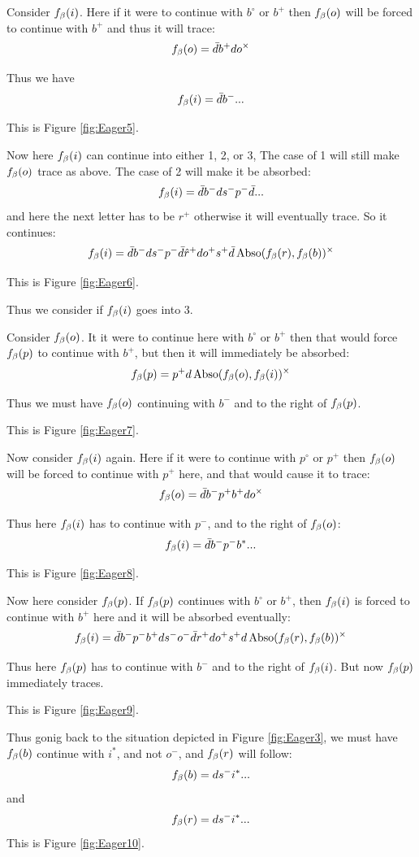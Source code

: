 Consider $f_\beta(i)$. Here if it were to continue with $b^\circ$ or $b^+$ then $f_\beta(o)$ will be forced to continue with $b^+$ and thus it will trace:
\[
f_\beta(o) = \bar{d} b^+ d o^\times
\]

Thus we have
\[
f_\beta(i) = \bar{d} b^-...
\]

This is Figure \ref{fig:Eager5}.

Now here $f_\beta(i)$ can continue into either 1, 2, or 3, The case of 1 will still make $f_\beta(o)$ trace as above. The case of 2 will make it be absorbed:
\[
f_\beta(i) = \bar{d} b^- d s^- p^- \bar{d}...
\]
and here the next letter has to be $r^+$ otherwise it will eventually trace. So it continues:
\[
f_\beta(i) = \bar{d} b^- d s^- p^- \bar{d} \hat{r}^+ d o^+ s^+ \bar{d} \operatorname{Abso}(f_\beta(r), f_\beta(b))^\times
\]

This is Figure \ref{fig:Eager6}.

Thus we consider if $f_\beta(i)$ goes into 3. 


Consider $f_\beta(o)$. It it were to continue here with $b^\circ$ or $b^+$ then that would force $f_\beta(p)$ to continue with $b^+$, but then it will immediately be absorbed:
\[
f_\beta(p) = p^+ d \operatorname{Abso}(f_\beta(o), f_\beta(i))^\times
\]

Thus we must have $f_\beta(o)$ continuing with $b^-$ and to the right of $f_\beta(p)$.

This is Figure \ref{fig:Eager7}.

Now consider $f_\beta(i)$ again. Here if it were to continue with $p^\circ$ or $p^+$ then $f_\beta(o)$ will be forced to continue with $p^+$ here, and that would cause it to trace:
\[
f_\beta(o) = \bar{d} b^- p^+ b^+ d o^\times
\]

Thus here $f_\beta(i)$ has to continue with $p^-$, and to the right of $f_\beta(o)$:
\[
f_\beta(i) = \bar{d} b^- p^- b^*...
\]

This is Figure \ref{fig:Eager8}.

Now here consider $f_\beta(p)$. If $f_\beta(p)$ continues with $b^\circ$ or $b^+$, then $f_\beta(i)$ is forced to continue with $b^+$ here and it will be absorbed eventually:
\[
f_\beta(i) = \bar{d} b^- p^- b^+ d s^- o^- \bar{d} r^+ d o^+ s^+ d \operatorname{Abso}(f_\beta(r), f_\beta(b))^\times
\]

Thus here $f_\beta(p)$ has to continue with $b^-$ and to the right of $f_\beta(i)$. But now $f_\beta(p)$ immediately traces.

This is Figure \ref{fig:Eager9}.


Thus gonig back to the situation depicted in Figure \ref{fig:Eager3}, we must have $f_\beta(b)$ continue with $i^*$, and not $o^-$, and $f_\beta(r)$ will follow:
\[
f_\beta(b) = d s^- i^*...
\]
and
\[
f_\beta(r) = d s^- i^*...
\]
This is Figure \ref{fig:Eager10}.

